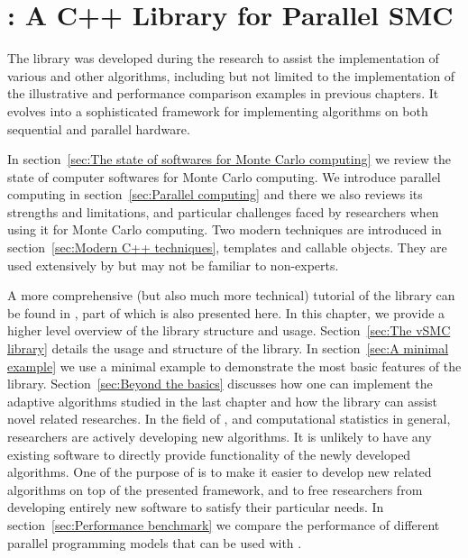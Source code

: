 \chapter[vSMC: A C++ Library for Parallel SMC]
{\protect\vsmc: A C++ Library for Parallel SMC}
\label{cha:vSMC: A C++ Library for Parallel SMC}

The \vsmc library \cite{software:VSMC} was developed during the research to
assist the implementation of various \smc and other algorithms, including but
not limited to the implementation of the illustrative and performance
comparison examples in previous chapters. It evolves into a sophisticated \cpp
framework for implementing \smc algorithms on both sequential and parallel
hardware.

In section~\ref{sec:The state of softwares for Monte Carlo computing} we
review the state of computer softwares for Monte Carlo computing. We introduce
parallel computing in section~\ref{sec:Parallel computing} and there we also
reviews its strengths and limitations, and particular challenges faced by
researchers when using it for Monte Carlo computing. Two modern \cpp
techniques are introduced in section~\ref{sec:Modern C++ techniques},
templates and callable objects. They are used extensively by \vsmc but may not
be familiar to non-experts.

A more comprehensive (but also much more technical) tutorial of the library
can be found in \cite{software:VSMC}, part of which is also presented here.
In this chapter, we provide a higher level overview of the library structure
and usage. Section~\ref{sec:The vSMC library} details the usage and structure
of the library. In section~\ref{sec:A minimal example} we use a minimal
example to demonstrate the most basic features of the library.
Section~\ref{sec:Beyond the basics} discusses how one can implement the
adaptive algorithms studied in the last chapter and how the library can assist
novel \smc related researches. In the field of \smc, and computational
statistics in general, researchers are actively developing new algorithms. It
is unlikely to have any existing software to directly provide functionality of
the newly developed algorithms. One of the purpose of \vsmc is to make it
easier to develop new \smc related algorithms on top of the presented
framework, and to free researchers from developing entirely new software to
satisfy their particular needs. In section~\ref{sec:Performance benchmark} we
compare the performance of different parallel programming models that can be
used with \vsmc.


